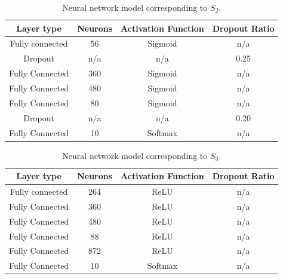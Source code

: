 \documentclass[journal]{IEEEtran}
\begin{document}
\begin{table}[!htb]
\begin{center}
\begin{tabular}{| c | c | c | c |}
\hline
Layer type & Neurons & Activation Function & Dropout Ratio \\
\hline
Fully connected & 56 & Sigmoid & n/a \\
Dropout & n/a & n/a & 0.25 \\
Fully Connected & 360 & Sigmoid & n/a\\
Fully Connected & 480 & Sigmoid & n/a\\
Fully Connected & 80 & Sigmoid & n/a\\
Dropout & n/a & n/a & 0.20\\
Fully Connected & 10 & Softmax & n/a\\
\hline
\end{tabular}
\end{center}
\caption{Neural network model corresponding to $S_2$.}
\label{table:neural_network_model_S2}
\end{table}

\begin{table}[!htb]
\begin{center}
\begin{tabular}{| c | c | c | c |}
\hline
Layer type & Neurons & Activation Function & Dropout Ratio \\
\hline
Fully connected & 264 & ReLU & n/a \\
Fully Connected & 360 & ReLU & n/a\\
Fully Connected & 480 & ReLU & n/a\\
Fully Connected & 88 & ReLU & n/a\\
Fully Connected & 872 & ReLU & n/a\\
Fully Connected & 10 & Softmax & n/a\\
\hline
\end{tabular}
\end{center}
\caption{Neural network model corresponding to $S_3$.}
\label{table:neural_network_model_S3}
\end{table}

\pagebreak
\end{document}
